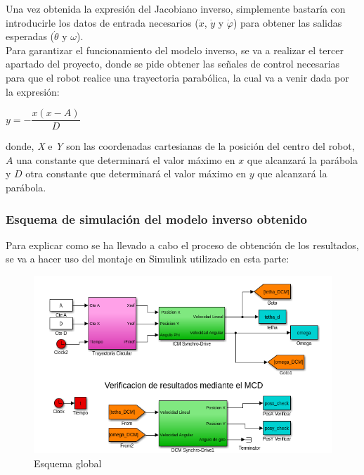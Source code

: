 \documentclass[a4paper,twoside]{article}
\begin{document}
Una vez obtenida la expresión del Jacobiano inverso, simplemente bastaría con introducirle los datos de entrada necesarios ($\dot{x}$, $\dot{y}$ y $\dot{\varphi}$) para obtener las salidas esperadas ($\dot{\theta}$ y $\omega$).\\

Para garantizar el funcionamiento del modelo inverso, se va a realizar el tercer apartado del proyecto, donde se pide obtener las señales de control necesarias para que el robot realice una trayectoria parabólica, la cual va a venir dada por la expresión:

\begin{center}
 $y=-\dfrac{x(x-A)}{D}$
\end{center}
donde, \textit{X} e \textit{Y} son las coordenadas cartesianas de la posición del centro del robot, $A$ una constante que determinará el valor máximo en $x$ que alcanzará la parábola y $D$ otra constante que determinará el valor máximo en $y$ que alcanzará la parábola.\\

	\subsubsection{Esquema de simulación del modelo inverso obtenido}
Para explicar como se ha llevado a cabo el proceso de obtención de los resultados, se va a hacer uso del montaje en Simulink utilizado en esta parte:
\begin{figure}[h!]
	\centering
	\includegraphics[width=.7\textwidth]{simulink_MCI_1}
	\caption{Esquema global}
\end{figure}


\end{document}
